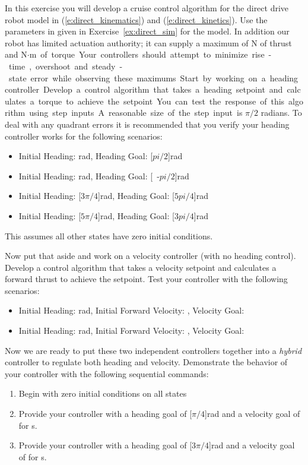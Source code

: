 \begin{ex}\label{ex:state_cntrl}
In this exercise you will develop a cruise control algorithm for the direct drive robot model in (\ref{e:direct_kinematics}) and (\ref{e:direct_kinetics}).  Use the parameters in given in Exercise~\ref{ex:direct_sim} for the model.  In addition our robot has limited actuation authority; it can supply a maximum of \unit[10]{N} of thrust and \unit[10]{N$\cdot$m} of torque.  Your controllers should attempt to minimize rise-time, overshoot and steady-state error while observing these maximums.

Start by working on a heading controller.  Develop a control algorithm that takes a heading setpoint and calculates a torque to achieve the setpoint.  You can test the response of this algorithm using step inputs.  A reasonable size of the step input is $\pi/2$ radians.  To deal with any quadrant errors it is recommended that you verify your heading controller works for the following scenarios:
\begin{itemize}
\item Initial Heading: \unit[0]{rad}, Heading Goal: \unit[$pi/2$]{rad}
\item Initial Heading: \unit[0]{rad}, Heading Goal: \unit[-$pi/2$]{rad}
\item Initial Heading: \unit[$3\pi/4$]{rad}, Heading Goal: \unit[$5pi/4$]{rad}
\item Initial Heading: \unit[$5\pi/4$]{rad}, Heading Goal: \unit[$3pi/4$]{rad}
\end{itemize}
This assumes all other states have zero initial conditions.

Now put that aside and work on a velocity controller (with no heading control).  Develop a control algorithm that takes a velocity setpoint and calculates a forward thrust to achieve the setpoint.  Test your controller with the following scenarios:
\begin{itemize}
\item Initial Heading: \unit[0]{rad}, Initial Forward Velocity: , Velocity Goal: 
\item Initial Heading: \unit[0]{rad}, Initial Forward Velocity: , Velocity Goal: 
\end{itemize}

Now we are ready to put these two independent controllers together into a \emph{hybrid} controller to regulate both heading and velocity.  Demonstrate the behavior of your controller with the following sequential commands:
\begin{enumerate}
\item Begin with zero initial conditions on all states
\item Provide your controller with a heading goal of \unit[$\pi/4$]{rad} and a velocity goal of  for \unit[5]{s}.
\item Provide your controller with a heading goal of \unit[$3\pi/4$]{rad} and a velocity goal of  for \unit[5]{s}.
\end{enumerate}


\end{ex}
